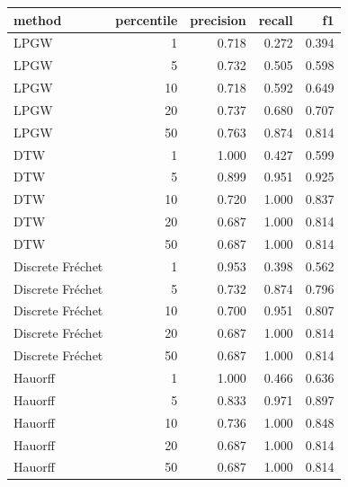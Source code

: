 \begin{tabular}{lrrrr}
\toprule
method & percentile & precision & recall & f1 \\
\midrule
LPGW & 1 & 0.718 & 0.272 & 0.394 \\
LPGW & 5 & 0.732 & 0.505 & 0.598 \\
LPGW & 10 & 0.718 & 0.592 & 0.649 \\
LPGW & 20 & 0.737 & 0.680 & 0.707 \\
LPGW & 50 & 0.763 & 0.874 & 0.814 \\
DTW & 1 & 1.000 & 0.427 & 0.599 \\
DTW & 5 & 0.899 & 0.951 & 0.925 \\
DTW & 10 & 0.720 & 1.000 & 0.837 \\
DTW & 20 & 0.687 & 1.000 & 0.814 \\
DTW & 50 & 0.687 & 1.000 & 0.814 \\
Discrete Fréchet & 1 & 0.953 & 0.398 & 0.562 \\
Discrete Fréchet & 5 & 0.732 & 0.874 & 0.796 \\
Discrete Fréchet & 10 & 0.700 & 0.951 & 0.807 \\
Discrete Fréchet & 20 & 0.687 & 1.000 & 0.814 \\
Discrete Fréchet & 50 & 0.687 & 1.000 & 0.814 \\
Hauorff & 1 & 1.000 & 0.466 & 0.636 \\
Hauorff & 5 & 0.833 & 0.971 & 0.897 \\
Hauorff & 10 & 0.736 & 1.000 & 0.848 \\
Hauorff & 20 & 0.687 & 1.000 & 0.814 \\
Hauorff & 50 & 0.687 & 1.000 & 0.814 \\
\bottomrule
\end{tabular}
